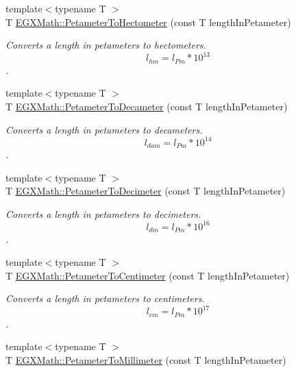 \begin{DoxyCompactItemize}
{\footnotesize template$<$typename T $>$ }\\T \mbox{\hyperlink{group___e_g_x_math-_conversions-_length_conversions-_petameter-_s_i_ga18de0d328d6200590dd25a522ad1aeb4}{E\+G\+X\+Math\+::\+Petameter\+To\+Hectometer}} (const T length\+In\+Petameter)
\begin{DoxyCompactList}\small\item\em Converts a length in petameters to hectometers. \[ l_{hm}=l_{Pm} * 10^{13} \]. \end{DoxyCompactList}\item 
{\footnotesize template$<$typename T $>$ }\\T \mbox{\hyperlink{group___e_g_x_math-_conversions-_length_conversions-_petameter-_s_i_gaf0fe67e33a48584d1f9f0ffa1ca4c8f9}{E\+G\+X\+Math\+::\+Petameter\+To\+Decameter}} (const T length\+In\+Petameter)
\begin{DoxyCompactList}\small\item\em Converts a length in petameters to decameters. \[ l_{dam}=l_{Pm} * 10^{14} \]. \end{DoxyCompactList}\item 
{\footnotesize template$<$typename T $>$ }\\T \mbox{\hyperlink{group___e_g_x_math-_conversions-_length_conversions-_petameter-_s_i_ga1e0359fb350c64cd3e1fc9293376de96}{E\+G\+X\+Math\+::\+Petameter\+To\+Decimeter}} (const T length\+In\+Petameter)
\begin{DoxyCompactList}\small\item\em Converts a length in petameters to decimeters. \[ l_{dm}=l_{Pm} * 10^{16} \]. \end{DoxyCompactList}\item 
{\footnotesize template$<$typename T $>$ }\\T \mbox{\hyperlink{group___e_g_x_math-_conversions-_length_conversions-_petameter-_s_i_ga68b8b99b5e0f36fee33e5f0d0dea3f2b}{E\+G\+X\+Math\+::\+Petameter\+To\+Centimeter}} (const T length\+In\+Petameter)
\begin{DoxyCompactList}\small\item\em Converts a length in petameters to centimeters. \[ l_{cm}=l_{Pm} * 10^{17} \]. \end{DoxyCompactList}\item 
{\footnotesize template$<$typename T $>$ }\\T \mbox{\hyperlink{group___e_g_x_math-_conversions-_length_conversions-_petameter-_s_i_ga932654bf571e2dd9aa912a34fbcfe49f}{E\+G\+X\+Math\+::\+Petameter\+To\+Millimeter}} (const T length\+In\+Petameter)

\end{DoxyCompactItemize}
